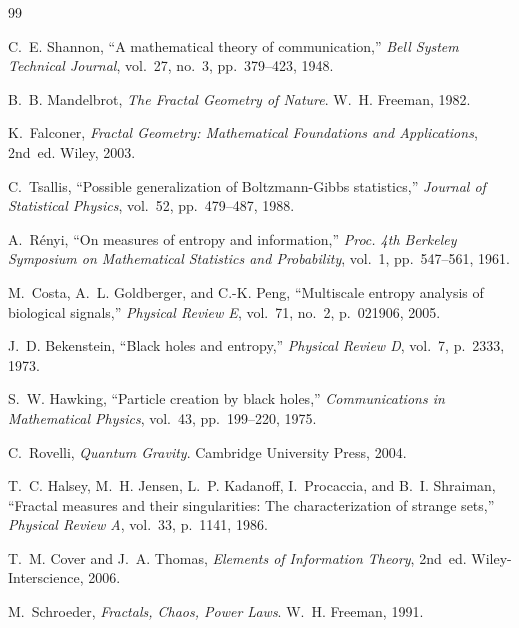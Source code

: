 \documentclass[11pt,a4paper]{article}
\theoremstyle{definition}
\theoremstyle{remark}
\begin{document}
\begin{thebibliography}{99}

C.~E. Shannon, ``A mathematical theory of communication,'' \textit{Bell System Technical Journal}, vol.~27, no.~3, pp.~379--423, 1948.

B.~B. Mandelbrot, \textit{The Fractal Geometry of Nature}. W.~H. Freeman, 1982.

K.~Falconer, \textit{Fractal Geometry: Mathematical Foundations and Applications}, 2nd~ed. Wiley, 2003.

C.~Tsallis, ``Possible generalization of Boltzmann-Gibbs statistics,'' \textit{Journal of Statistical Physics}, vol.~52, pp.~479--487, 1988.

A.~R\'enyi, ``On measures of entropy and information,'' \textit{Proc. 4th Berkeley Symposium on Mathematical Statistics and Probability}, vol.~1, pp.~547--561, 1961.

M.~Costa, A.~L. Goldberger, and C.-K. Peng, ``Multiscale entropy analysis of biological signals,'' \textit{Physical Review E}, vol.~71, no.~2, p.~021906, 2005.

J.~D. Bekenstein, ``Black holes and entropy,'' \textit{Physical Review D}, vol.~7, p.~2333, 1973.

S.~W. Hawking, ``Particle creation by black holes,'' \textit{Communications in Mathematical Physics}, vol.~43, pp.~199--220, 1975.

C.~Rovelli, \textit{Quantum Gravity}. Cambridge University Press, 2004.

T.~C. Halsey, M.~H. Jensen, L.~P. Kadanoff, I.~Procaccia, and B.~I. Shraiman, ``Fractal measures and their singularities: The characterization of strange sets,'' \textit{Physical Review A}, vol.~33, p.~1141, 1986.

T.~M. Cover and J.~A. Thomas, \textit{Elements of Information Theory}, 2nd~ed. Wiley-Interscience, 2006.

M.~Schroeder, \textit{Fractals, Chaos, Power Laws}. W.~H. Freeman, 1991.

\end{thebibliography}
\end{document}
